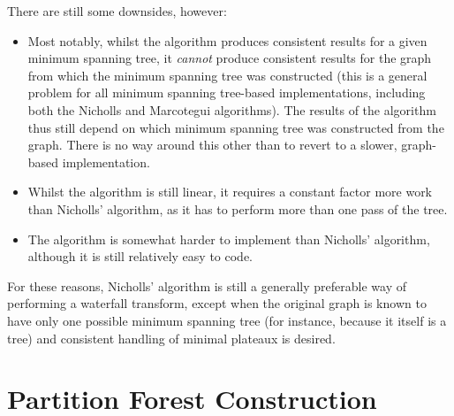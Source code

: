\noindent There are still some downsides, however:
%
\begin{itemize}
\item Most notably, whilst the algorithm produces consistent results for a given minimum spanning tree, it \emph{cannot} produce consistent results for the graph from which the minimum spanning tree was constructed (this is a general problem for all minimum spanning tree-based implementations, including both the Nicholls and Marcotegui algorithms). The results of the algorithm thus still depend on which minimum spanning tree was constructed from the graph. There is no way around this other than to revert to a slower, graph-based implementation.
\item Whilst the algorithm is still linear, it requires a constant factor more work than Nicholls' algorithm, as it has to perform more than one pass of the tree.
\item The algorithm is somewhat harder to implement than Nicholls' algorithm, although it is still relatively easy to code.
\end{itemize}
%
For these reasons, Nicholls' algorithm is still a generally preferable way of performing a waterfall transform, except when the original graph is known to have only one possible minimum spanning tree (for instance, because it itself is a tree) and consistent handling of minimal plateaux is desired.

\section{Partition Forest Construction}

